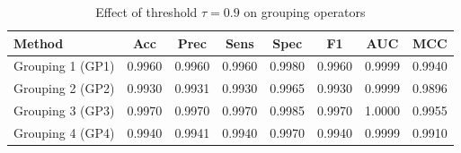 \begin{table}[htbp]
\centering
\caption{Effect of threshold $\tau = 0.9$ on grouping operators}
\label{tab:t1_tau09}
\begin{tabular}{lccccccc}
\toprule
Method & Acc & Prec & Sens & Spec & F1 & AUC & MCC \\
\midrule
Grouping 1 (GP1) & 0.9960 & 0.9960 & 0.9960 & 0.9980 & 0.9960 & 0.9999 & 0.9940 \\
Grouping 2 (GP2) & 0.9930 & 0.9931 & 0.9930 & 0.9965 & 0.9930 & 0.9999 & 0.9896 \\
Grouping 3 (GP3) & 0.9970 & 0.9970 & 0.9970 & 0.9985 & 0.9970 & 1.0000 & 0.9955 \\
Grouping 4 (GP4) & 0.9940 & 0.9941 & 0.9940 & 0.9970 & 0.9940 & 0.9999 & 0.9910 \\
\bottomrule
\end{tabular}
\end{table}
